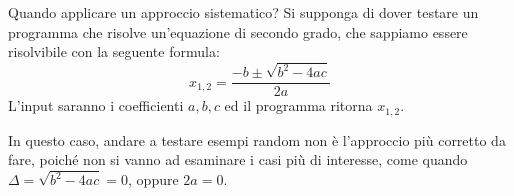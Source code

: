 \begin{example}{}{Quando applicare un approccio sistematico?}
    Si supponga di dover testare un programma che risolve un'equazione di secondo grado, che sappiamo essere risolvibile con la seguente formula:
    $$x_{1,2} = \frac{- b \pm \sqrt{b^2 - 4ac}}{2a}$$
    L'input saranno i coefficienti $a,b,c$ ed il programma ritorna $x_{1,2}$.

    In questo caso, andare a testare esempi random non è l'approccio più corretto da fare, poiché non si vanno ad esaminare i casi più di interesse, come quando $\Delta = \sqrt{b^2 - 4ac} = 0$, oppure $2a = 0$.
\end{example}


